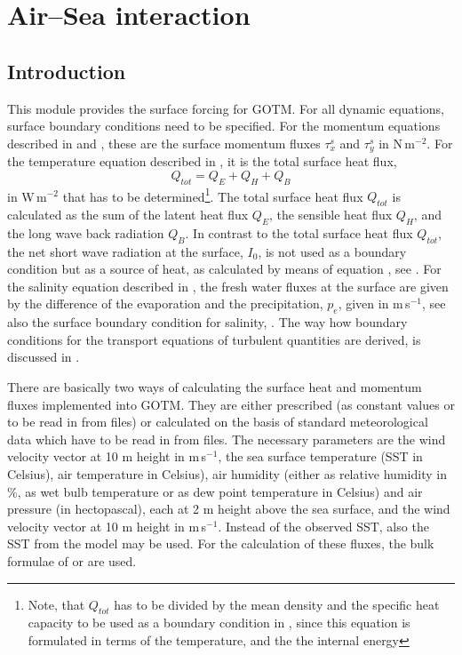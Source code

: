 %
%

\section{Air--Sea interaction \label{sec:airseaIntro}}

\subsection{Introduction}

This module provides the surface forcing for GOTM. For all dynamic
equations, surface boundary conditions need to be specified.  For the
momentum equations described in  and
, these are the surface momentum fluxes $\tau_x^s$ and
$\tau_y^s$ in N\,m$^{-2}$. For the temperature
equation described in , it is the total surface heat flux,
\begin{equation}
  Q_{tot}=Q_E+Q_H+Q_B
\end{equation}
in W\,m$^{-2}$ that has to be determined\footnote{Note, that $Q_{tot}$
has to be divided by the mean density and the specific heat capacity
to be used as a boundary condition in , since this equation is
formulated in terms of the temperature, and the the internal
energy}. The total surface heat flux $Q_{tot}$ is calculated as the
sum of the latent heat flux $Q_E$, the sensible heat flux $Q_H$, and
the long wave back radiation $Q_B$.  In contrast to the total surface
heat flux $Q_{tot}$, the net short wave radiation at the surface,
$I_0$, is not used as a boundary condition but as a source of heat, as
calculated by means of equation , see \cite{PaulsonSimpson77}.
For the salinity equation described in , the fresh
water fluxes at the surface are given by the difference 
of the evaporation and the 
precipitation, $p_e$, given in m\,s$^{-1}$, see also the surface boundary
condition for salinity, . 
The way how boundary conditions for the
transport equations of turbulent quantities are derived, is discussed
in .

There are basically two ways of calculating the surface heat and
momentum fluxes implemented into GOTM. They are either prescribed (as
constant values or to be read in from files) or calculated on the
basis of standard meteorological data which have to be read in from
files. The necessary parameters are 
the wind velocity vector at 10 m height in m\,s$^{-1}$,
the sea surface temperature (SST in Celsius), 
air temperature in Celsius), air humidity (either as relative humidity
in \%, as wet bulb temperature or as dew point
temperature in Celsius) and air pressure (in hectopascal), each at 2 m height
above the sea surface, and
the wind velocity vector at 10 m height in m\,s$^{-1}$. 
Instead of the observed SST,
also the SST from the model may be used.  For the calculation of these
fluxes, the bulk formulae of \cite{Kondo75} or \cite{Fairalletal96a}
are used. 
